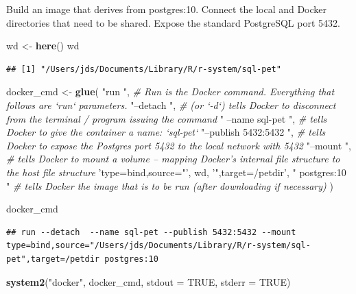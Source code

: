 \documentclass[]{book}
\newenvironment{Shaded}{\begin{snugshade}}{\end{snugshade}}
\newcommand{\CommentTok}[1]{\textcolor[rgb]{0.56,0.35,0.01}{\textit{#1}}}
\newcommand{\DataTypeTok}[1]{\textcolor[rgb]{0.13,0.29,0.53}{#1}}
\newcommand{\KeywordTok}[1]{\textcolor[rgb]{0.13,0.29,0.53}{\textbf{#1}}}
\newcommand{\NormalTok}[1]{#1}
\newcommand{\OtherTok}[1]{\textcolor[rgb]{0.56,0.35,0.01}{#1}}
\newcommand{\StringTok}[1]{\textcolor[rgb]{0.31,0.60,0.02}{#1}}
\theoremstyle{definition}
\theoremstyle{definition}
\theoremstyle{definition}
\theoremstyle{remark}
\begin{document}
Build an image that derives from postgres:10. Connect the local and
Docker directories that need to be shared. Expose the standard
PostgreSQL port 5432.

\begin{Shaded}
\begin{Highlighting}[]
\NormalTok{wd <-}\StringTok{ }\KeywordTok{here}\NormalTok{()}
\NormalTok{wd}
\end{Highlighting}
\end{Shaded}

\begin{verbatim}
## [1] "/Users/jds/Documents/Library/R/r-system/sql-pet"
\end{verbatim}

\begin{Shaded}
\begin{Highlighting}[]
\NormalTok{docker_cmd <-}\StringTok{ }\KeywordTok{glue}\NormalTok{(}
  \StringTok{"run "}\NormalTok{,      }\CommentTok{# Run is the Docker command.  Everything that follows are `run` parameters.}
  \StringTok{"--detach "}\NormalTok{, }\CommentTok{# (or `-d`) tells Docker to disconnect from the terminal / program issuing the command}
  \StringTok{" --name sql-pet "}\NormalTok{,     }\CommentTok{# tells Docker to give the container a name: `sql-pet`}
  \StringTok{"--publish 5432:5432 "}\NormalTok{, }\CommentTok{# tells Docker to expose the Postgres port 5432 to the local network with 5432}
  \StringTok{"--mount "}\NormalTok{, }\CommentTok{# tells Docker to mount a volume -- mapping Docker's internal file structure to the host file structure}
  \StringTok{'type=bind,source="'}\NormalTok{, wd, }\StringTok{'",target=/petdir'}\NormalTok{,}
  \StringTok{" postgres:10 "} \CommentTok{# tells Docker the image that is to be run (after downloading if necessary)}
\NormalTok{)}

\NormalTok{docker_cmd}
\end{Highlighting}
\end{Shaded}

\begin{verbatim}
## run --detach  --name sql-pet --publish 5432:5432 --mount type=bind,source="/Users/jds/Documents/Library/R/r-system/sql-pet",target=/petdir postgres:10
\end{verbatim}

\begin{Shaded}
\begin{Highlighting}[]
\KeywordTok{system2}\NormalTok{(}\StringTok{"docker"}\NormalTok{, docker_cmd, }\DataTypeTok{stdout =} \OtherTok{TRUE}\NormalTok{, }\DataTypeTok{stderr =} \OtherTok{TRUE}\NormalTok{)}
\end{Highlighting}
\end{Shaded}
\end{document}
